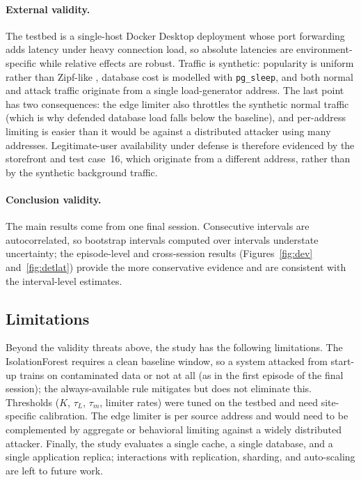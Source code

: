 \documentclass[preprint,12pt]{elsarticle}
\begin{document}
\paragraph{External validity.} The testbed is a single-host Docker Desktop deployment
whose port forwarding adds latency under heavy connection load, so absolute latencies
are environment-specific while relative effects are robust. Traffic is synthetic:
popularity is uniform rather than Zipf-like \cite{breslau1999}, database cost is
modelled with \texttt{pg\_sleep}, and both normal and attack traffic originate from a
single load-generator address. The last point has two consequences: the edge limiter
also throttles the synthetic normal traffic (which is why defended database load falls
below the baseline), and per-address limiting is easier than it would be against a
distributed attacker using many addresses. Legitimate-user availability under defense
is therefore evidenced by the storefront and test case~16, which originate from a
different address, rather than by the synthetic background traffic.

\paragraph{Conclusion validity.} The main results come from one final session.
Consecutive intervals are autocorrelated, so bootstrap intervals computed over
intervals understate uncertainty; the episode-level and cross-session results
(Figures~\ref{fig:dev} and~\ref{fig:detlat}) provide the more conservative evidence and
are consistent with the interval-level estimates.

\subsection{Limitations}
\label{sec:limitations}
Beyond the validity threats above, the study has the following limitations. The
IsolationForest requires a clean baseline window, so a system attacked from start-up
trains on contaminated data or not at all (as in the first episode of the final
session); the always-available rule mitigates but does not eliminate this. Thresholds
($K$, $\tau_L$, $\tau_m$, limiter rates) were tuned on the testbed and need site-specific
calibration. The edge limiter is per source address and would need to be complemented
by aggregate or behavioral limiting against a widely distributed attacker. Finally, the
study evaluates a single cache, a single database, and a single application replica;
interactions with replication, sharding, and auto-scaling are left to future work.
\end{document}
